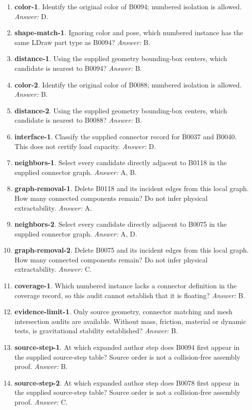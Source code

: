 \begin{enumerate}
\item \textbf{color-1}. Identify the original color of B0094; numbered isolation is allowed. \textit{Answer:} D.
\item \textbf{shape-match-1}. Ignoring color and pose, which numbered instance has the same LDraw part type as B0094? \textit{Answer:} B.
\item \textbf{distance-1}. Using the supplied geometry bounding-box centers, which candidate is nearest to B0094? \textit{Answer:} B.
\item \textbf{color-2}. Identify the original color of B0088; numbered isolation is allowed. \textit{Answer:} B.
\item \textbf{distance-2}. Using the supplied geometry bounding-box centers, which candidate is nearest to B0088? \textit{Answer:} B.
\item \textbf{interface-1}. Classify the supplied connector record for B0037 and B0040. This does not certify load capacity. \textit{Answer:} D.
\item \textbf{neighbors-1}. Select every candidate directly adjacent to B0118 in the supplied connector graph. \textit{Answer:} A, B.
\item \textbf{graph-removal-1}. Delete B0118 and its incident edges from this local graph. How many connected components remain? Do not infer physical extractability. \textit{Answer:} A.
\item \textbf{neighbors-2}. Select every candidate directly adjacent to B0075 in the supplied connector graph. \textit{Answer:} A, D.
\item \textbf{graph-removal-2}. Delete B0075 and its incident edges from this local graph. How many connected components remain? Do not infer physical extractability. \textit{Answer:} C.
\item \textbf{coverage-1}. Which numbered instance lacks a connector definition in the coverage record, so this audit cannot establish that it is floating? \textit{Answer:} B.
\item \textbf{evidence-limit-1}. Only source geometry, connector matching and mesh intersection audits are available. Without mass, friction, material or dynamic tests, is gravitational stability established? \textit{Answer:} B.
\item \textbf{source-step-1}. At which expanded author step does B0094 first appear in the supplied source-step table? Source order is not a collision-free assembly proof. \textit{Answer:} B.
\item \textbf{source-step-2}. At which expanded author step does B0078 first appear in the supplied source-step table? Source order is not a collision-free assembly proof. \textit{Answer:} C.

\end{enumerate}
